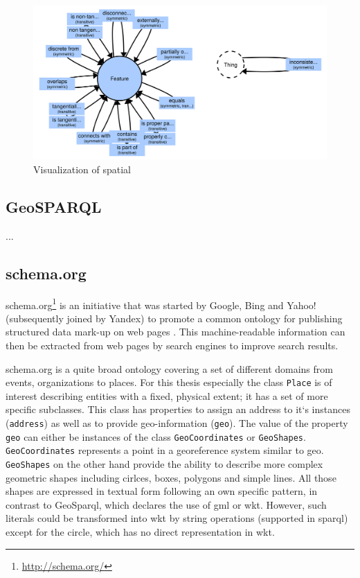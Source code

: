\documentclass[draft,final]{vutinfth} %
\begin{document}
\begin{figure}[h]
    \centering
    \includegraphics[width=1.0\textwidth]{graphics/vocabularies/spatial.png}
    \caption{Visualization of \gls{spatial}}
    \label{fig:related-work-geospatial-ontologies:spatial}
\end{figure}


\subsection{GeoSPARQL}
...

\subsection{schema.org}
schema.org\footnote{\url{http://schema.org/}} is an initiative that was started by Google, Bing and Yahoo! (subsequently joined by Yandex) to promote a common ontology for publishing structured data mark-up on web pages \cite{guha_introducing_2011}. This machine-readable information can then be extracted from web pages by search engines to improve search results.

schema.org is a quite broad ontology covering a set of different domains from events, organizations to places. For this thesis especially the class \texttt{Place} is of interest describing entities with a fixed, physical extent; it has a set of more specific subclasses. This class has properties to assign an address to it`s instances  (\texttt{address}) as well as to provide geo-information (\texttt{geo}). The value of the property \texttt{geo} can either be instances of the class \texttt{GeoCoordinates} or \texttt{GeoShapes}. \texttt{GeoCoordinates} represents a point in a georeference system similar to \gls{geo}. \texttt{GeoShapes} on the other hand provide the ability to describe more complex geometric shapes including cirlces, boxes, polygons and simple lines. All those shapes are expressed in textual form following an own specific pattern, in contrast to GeoSparql, which declares the use of \gls{gml} or \gls{wkt}. However, such literals could be transformed into \gls{wkt} by string operations (supported in \gls{sparql}) except for the circle, which has no direct representation in \gls{wkt}.
\end{document}

